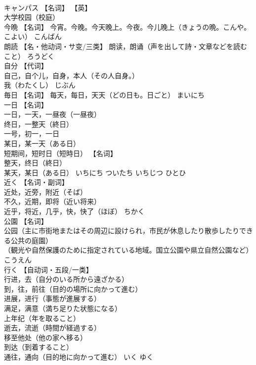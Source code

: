\documentclass[8pt]{extreport}
\begin{document}
\begin{CJK}{UTF8}{min}
\\	キャンパス	【名词】 【英】
\\	大学校园（校庭）		
\\	今晩	【名词】 今宵。今晚。今天晚上。今夜。今儿晚上（きょうの晩。こんや。こよい）	こんばん	
\\	朗読	【名・他动词・サ变/三类】 朗读，朗诵（声を出して詩・文章などを読むこと）	ろうどく	
\\	自分	【代词】 
\\	自己，自个儿，自身，本人（その人自身。） 
\\	我（わたくし）	じぶん	
\\	毎日	【名词】 每天，每日，天天（どの日も。日ごと）	まいにち	
\\	一日	【名词】 
\\	一日，一天，一昼夜（一昼夜） 
\\	终日，一整天（終日） 
\\	一号，初一，一日 
\\	某日，某一天（ある日） 
\\	短期间，短时日（短時日） 【名词】 
\\	整天，终日（終日） 
\\	某天，某日（ある日）	いちにち ついたち いちじつ ひとひ	
\\	近く	【名词・副词】 
\\	近处，近旁，附近（そば） 
\\	不久，近期，即将（近い将来） 
\\	近乎，将近，几乎，快，快了（ほぼ）	ちかく	
\\	公園	【名词】 
\\	公园（主に市街地またはその周辺に設けられ，市民が休息したり散歩したりできる公共の庭園） 
\\	（観光や自然保護のために指定されている地域。国立公園や県立自然公園など）	こうえん	
\\	行く	【自动词・五段/一类】 
\\	行进，去（自分のいる所から遠ざかる） 
\\	到，往，前往（目的の場所に向かって進む） 
\\	进展，进行（事態が進展する） 
\\	满足，满意（満ち足りた状態になる） 
\\	上年纪（年を取ること） 
\\	逝去，流逝（時間が経過する） 
\\	移至他处（他の家へ移る） 
\\	到达（到着すること） 
\\	通往，通向（目的地に向かって進む）	いく ゆく	

\end{CJK}
\end{document}
